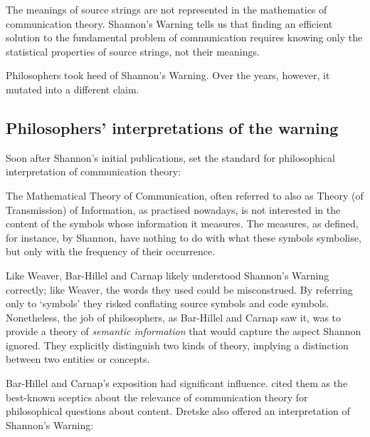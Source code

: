 \documentclass[12pt]{article}
\begin{document}
\noindent The meanings of source strings are not represented in the mathematics of communication theory.
{\sc Shannon's Warning} tells us that finding an efficient solution to the fundamental problem of communication requires knowing only the statistical properties of source strings, not their meanings.

Philosophers took heed of {\sc Shannon's Warning}.
Over the years, however, it mutated into a different claim.


\subsection{Philosophers' interpretations of the warning}\label{subsec:warningPhil}

Soon after Shannon's initial publications, \citet{bar-hillel1953semantic} set the standard for philosophical interpretation of communication theory:

\begin{myquote}
The Mathematical Theory of Communication, often referred to also as Theory (of Transmission) of Information, as practised nowadays, is not interested in the content of the symbols whose information it measures. The measures, as defined, for instance, by Shannon, have nothing to do with what these symbols symbolise, but only with the frequency of their occurrence.
\par\hspace*{\fill}\citet[147]{bar-hillel1953semantic}
\end{myquote}

\noindent Like Weaver, Bar-Hillel and Carnap likely understood {\sc Shannon's Warning} correctly; like Weaver, the words they used could be misconstrued.
By referring only to `symbols' they risked conflating source symbols and code symbols.
Nonetheless, the job of philosophers, as Bar-Hillel and Carnap saw it, was to provide a theory of \textit{semantic information} that would capture the aspect Shannon ignored.
They explicitly distinguish two kinds of theory, implying a distinction between two entities or concepts.

Bar-Hillel and Carnap's exposition had significant influence.
\citet[p. 241, n.
1]{dretske1981knowledge} cited them as the best-known sceptics about the relevance of communication theory for philosophical questions about content.
Dretske also offered an interpretation of {\sc Shannon's Warning}:
\end{document}
